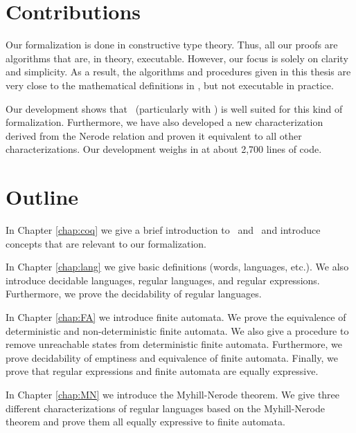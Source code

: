 \section{Contributions}
Our formalization is done in constructive type theory.
Thus, all our proofs are algorithms that are, in theory, executable.
However, our focus is solely on clarity and simplicity.
As a result, the algorithms and procedures given in this thesis 
are very close to the mathematical definitions in \cite{DBLP:books/daglib/0088160}, 
but not executable in practice. 

Our development shows that \coq\ (particularly with \ssreflect) is well suited for this kind of formalization.
Furthermore, we have also developed a new characterization derived from the Nerode relation and proven it equivalent to all other characterizations.
Our development weighs in at about 2,700 lines of code.


\section{Outline}
In Chapter \ref{chap:coq} we give a brief introduction to \coq\ and \ssreflect\ and introduce concepts that are relevant to our formalization.

In Chapter \ref{chap:lang} we give basic definitions (words, languages, etc.). 
We also introduce decidable languages, regular languages, and regular expressions. 
Furthermore, we prove the decidability of regular languages.

In Chapter \ref{chap:FA} we introduce finite automata.
We prove the equivalence of deterministic and non-deterministic finite automata.
We also give a procedure to remove unreachable states from deterministic finite automata.
Furthermore, we prove decidability of emptiness and equivalence of finite automata.
Finally, we prove that regular expressions and finite automata are equally expressive.

In Chapter \ref{chap:MN} we introduce the Myhill-Nerode theorem.
We give three different characterizations of regular languages based on the Myhill-Nerode theorem and prove them all equally expressive to finite automata.
